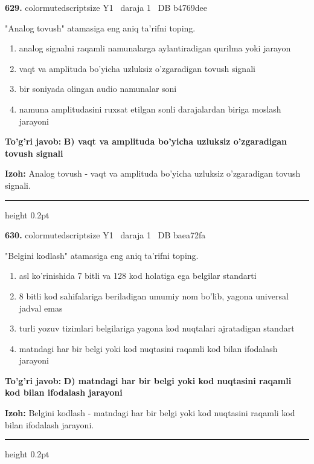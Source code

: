 \documentclass[10pt,a4paper,oneside]{article}
\begin{document}
\noindent\textbf{\color{ink}629.}  {color{muted}scriptsize Y1 \textbullet\ daraja 1 \textbullet\ DB b4769dee}
\par
"Analog tovush" atamasiga eng aniq ta'rifni toping.
\begin{enumerate}[label=\Alph*),leftmargin=9mm]
\item analog signalni raqamli namunalarga aylantiradigan qurilma yoki jarayon
\item vaqt va amplituda bo'yicha uzluksiz o'zgaradigan tovush signali
\item bir soniyada olingan audio namunalar soni
\item namuna amplitudasini ruxsat etilgan sonli darajalardan biriga moslash jarayoni
\end{enumerate}
\begin{tcolorbox}[enhanced,breakable,colback=teal!4,colframe=teal!50!black,boxrule=0.5pt,arc=1.1mm,left=3mm,right=3mm,top=1.7mm,bottom=1.7mm,before skip=2mm,after skip=2mm]
\textbf{\color{teal}To'g'ri javob:} \textbf{B) vaqt va amplituda bo'yicha uzluksiz o'zgaradigan tovush signali}
\par\smallskip
\textbf{Izoh:} Analog tovush - vaqt va amplituda bo'yicha uzluksiz o'zgaradigan tovush signali.
\end{tcolorbox}
\vspace{2mm}\hrule height 0.2pt \vspace{3mm}

\noindent\textbf{\color{ink}630.}  {color{muted}scriptsize Y1 \textbullet\ daraja 1 \textbullet\ DB baea72fa}
\par
"Belgini kodlash" atamasiga eng aniq ta'rifni toping.
\begin{enumerate}[label=\Alph*),leftmargin=9mm]
\item asl ko'rinishida 7 bitli va 128 kod holatiga ega belgilar standarti
\item 8 bitli kod sahifalariga beriladigan umumiy nom bo'lib, yagona universal jadval emas
\item turli yozuv tizimlari belgilariga yagona kod nuqtalari ajratadigan standart
\item matndagi har bir belgi yoki kod nuqtasini raqamli kod bilan ifodalash jarayoni
\end{enumerate}
\begin{tcolorbox}[enhanced,breakable,colback=teal!4,colframe=teal!50!black,boxrule=0.5pt,arc=1.1mm,left=3mm,right=3mm,top=1.7mm,bottom=1.7mm,before skip=2mm,after skip=2mm]
\textbf{\color{teal}To'g'ri javob:} \textbf{D) matndagi har bir belgi yoki kod nuqtasini raqamli kod bilan ifodalash jarayoni}
\par\smallskip
\textbf{Izoh:} Belgini kodlash - matndagi har bir belgi yoki kod nuqtasini raqamli kod bilan ifodalash jarayoni.
\end{tcolorbox}
\vspace{2mm}\hrule height 0.2pt \vspace{3mm}
\end{document}
